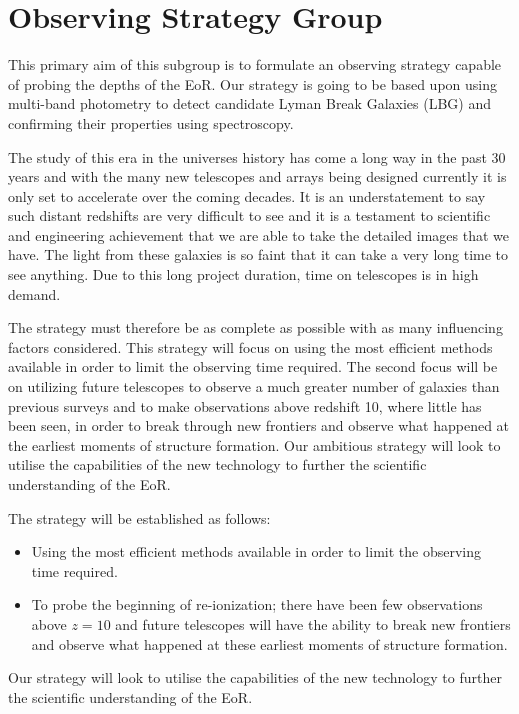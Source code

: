 \section{Observing Strategy Group} %
\label{sec:observing_strategy_group}
	This primary aim of this subgroup is to formulate an observing strategy capable of probing the depths of the EoR. Our strategy is going to be based upon using multi-band photometry to detect candidate Lyman Break Galaxies (LBG) and confirming their properties using spectroscopy.

	The study of this era in the universes history has come a long way in the past 30 years and with the many new telescopes and arrays being designed currently it is only set to accelerate over the coming decades. It is an understatement to say such distant redshifts are very difficult to see and it is a testament to scientific and engineering achievement that we are able to take the detailed images that we have. The light from these galaxies is so faint that it can take a very long time to see anything. Due to this long project duration, time on telescopes is in high demand.

	The strategy must therefore be as complete as possible with as many influencing factors considered. This strategy will focus on using the most efficient methods available in order to limit the observing time required. The second focus will be on utilizing future telescopes to observe a much greater number of galaxies than previous surveys and to make observations above redshift 10, where little has been seen, in order to break through new frontiers and observe what happened at the earliest moments of structure formation. Our ambitious strategy will look to utilise the capabilities of the new technology to further the scientific understanding of the EoR.

	The strategy will be established as follows:
	\begin{itemize}
		\item Using the most efficient methods available in order to limit the observing time required.
		\item To probe the beginning of re-ionization; there have been few observations above $z=10$ and future telescopes will have the ability to break new frontiers and observe what happened at these earliest moments of structure formation.
	\end{itemize}

	Our strategy will look to utilise the capabilities of the new technology to further the scientific understanding of the EoR.


